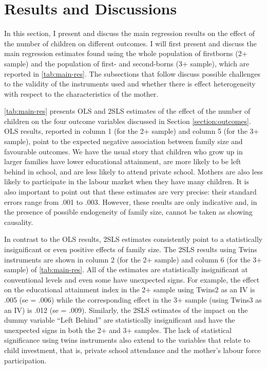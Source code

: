 
\section{Results and Discussions}
\label{section:results}

In this section, I present and discuss the main regression results on the effect of the number of children on different outcomes. I will first present and discuss the main regression estimates found using the whole population of firstborns (2+ sample) and the population of first- and second-borns (3+ sample), which are reported in \autoref{tab:main-res}. The subsections that follow discuss possible challenges to the validity of the instruments used and whether there is effect heterogeneity with respect to the characteristics of the mother.



\autoref{tab:main-res} presents OLS and 2SLS estimates of the effect of the number of children on the four outcome variables discussed in Section \ref{section:outcomes}. OLS results, reported in column 1 (for the 2+ sample) and column 5 (for the 3+ sample), point to the expected negative association between family size and favourable outcomes. We have the usual story that children who grow up in larger families have lower educational attainment, are more likely to be left behind in school, and are less likely to attend private school. Mothers are also less likely to participate in the labour market when they have many children. It is also important to point out that these estimates are very precise: their standard errors range from .001 to .003. However, these results are only indicative and, in the presence of possible endogeneity of family size, cannot be taken as showing causality.

In contrast to the OLS results, 2SLS estimates consistently point to a statistically insignificant or even positive effects of family size. The 2SLS results using Twins instruments are shown in column 2 (for the 2+ sample) and column 6 (for the 3+ sample) of \autoref{tab:main-res}. All of the estimates are statistically insignificant at conventional levels and even some have unexpected signs. For example, the effect on the educational attainment index in the 2+ sample using Twins2 as an IV is .005 (se = .006) while the corresponding effect in the 3+ sample (using Twins3 as an IV) is .012 (se = .009). Similarly, the 2SLS estimates of the impact on the dummy variable \enquote{Left Behind} are statistically insignificant and have the unexpected signs in both the 2+ and 3+ samples. The lack of statistical significance using twins instruments also extend to the variables that relate to child investment, that is, private school attendance and the mother's labour force participation. 

